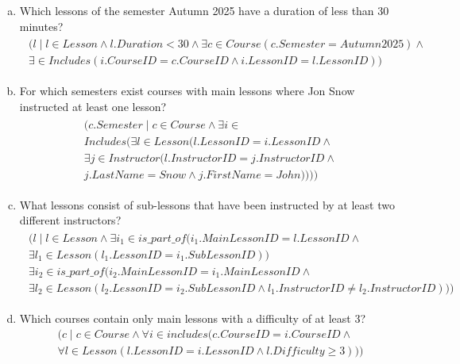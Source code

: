 \documentclass{article}
\begin{document}
\begin{enumerate}[(a)]
\item Which lessons of the semester Autumn 2025 have a duration of less than 30 minutes?
\begin{align}
    \begin{split}
   (l \mid l \in Lesson \wedge l.Duration < 30 \wedge \exists c \in Course (c.Semester = Autumn 2025)\wedge \\ 
   \exists\in Includes(i.CourseID=c.CourseID\wedge i.LessonID = l.LessonID))
    \end{split}
\end{align}

\item For which semesters exist courses with main lessons where Jon Snow instructed at least one lesson?
\begin{align}
    \begin{split}
   (c.Semester \mid c \in Course\wedge\exists i \in \\
   Includes(\exists l \in Lesson(l.LessonID = i.LessonID \wedge \\
   \exists j \in Instructor (l.InstructorID = j.InstructorID \wedge \\ 
   j.LastName=Snow \wedge j.FirstName = John))))
    \end{split}
\end{align}

\item What lessons consist of sub-lessons that have been instructed by at least two different instructors?
\begin{align}
    \begin{split}
   (l \mid l \in Lesson \wedge \exists i_1 \in is\_part\_of (i_1.MainLessonID=l.LessonID\wedge \\
   \exists l_1 \in Lesson(l_1.LessonID=i_1.SubLessonID))\\
   \exists i_2 \in is\_part\_of (i_2.MainLessonID=i_1.MainLessonID\wedge \\
   \exists l_2 \in Lesson(l_2.LessonID=i_2.SubLessonID\wedge l_1.InstructorID \neq l_2.InstructorID)))
    \end{split}
\end{align}

\item Which courses contain only main lessons with a difficulty of at least 3?
\begin{equation}
    \begin{split}
    (c \mid c \in Course \wedge \forall i\in includes(c.CourseID = i.CourseID \wedge \\
    \forall l \in Lesson(l.LessonID=i.LessonID\wedge l.Difficulty \geq 3)))
    \end{split}
\end{equation}


\end{enumerate}
\end{document}
